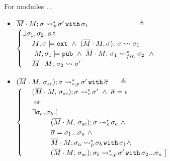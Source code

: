 \begin{definition}
For moduiles ...

\begin{itemize}
\item
$\overline{M}\cdot M; \sigma \rightsquigarrow ^*\!\!\!\!_{p}\, \sigma' \, \mbox{\normalfont{\texttt{with}}}\,  {\sigma_1} $ \  \ \ \ \  \ \ \ \ \ \ \ \ $\triangleq$ \ \ 
$\begin{cases}
\exists  \sigma_1, \sigma_2,\,  \mbox{s.t}\\
\strut \ \ \ \  M, \sigma  \models \extThis \ \wedge \  \leadstoBoundedThree  {\Mtwo\cdot M} {\sigma} {\sigma}  {\sigma_{1}} \\ 
\strut \ \ \ \ \ M, \sigma_1 \models \pubMeth \ \wedge\  \leadstoBoundedStarFin {\Mtwo\cdot M} {\sigma_1}  {\sigma_2}    \ \ \wedge \\
\strut \ \ \ \   \leadstoBounded  {\Mtwo\cdot M} {\sigma_2}      {\sigma'} 
\end{cases}
$
\item
$(\overline{M}\cdot M,\, {\sigma_{sc}}); \sigma \rightsquigarrow ^*\!\!\!\!_{e,p}\, \sigma'\,  \mbox{\normalfont{\texttt{with}}}\,  \overline \sigma $   \ \  $\triangleq$ \ \ 
$\begin{cases}
\strut \ \ \ \  \leadstoBoundedThreeStarExt  {\Mtwo\cdot M} {\sigma\bd}  {\sigma}  {\sigma'}\ \wedge \ \overline \sigma = \epsilon\\
\strut \ \ \ \   \ \mbox{or} \\
\strut \ \ \ \  \exists \sigma_a, \sigma_b.[\  \\
\strut \ \ \ \  \ \ \ \   \ \ \ \   \leadstoBoundedThreeStarExt  {\Mtwo\cdot M} {\sigma\bd}  {\sigma}  {\sigma_a} \ \wedge \\ 
\strut \ \ \ \  \ \ \ \   \ \ \ \   \overline \sigma = \sigma_1 ... \sigma_n \ \wedge \\
\strut \ \ \ \  \ \ \ \   \ \ \ \   \leadstoBoundedPub {\Mtwo\cdot M}  {\sigma_a}  {\sigma_b}\,  \prg{with}\,  \sigma_1 \wedge \\ 
\strut \ \ \ \  \ \ \ \   \ \ \ \  \leadstoBoundedThreeExtPub {\Mtwo\cdot M} {\sigma\bd}  {\sigma_b}  {\sigma'}\,  \prg{with}\,  {\sigma_2...\sigma_{n}} \ ]
\end{cases}
$
\end{itemize}
\end{definition}




